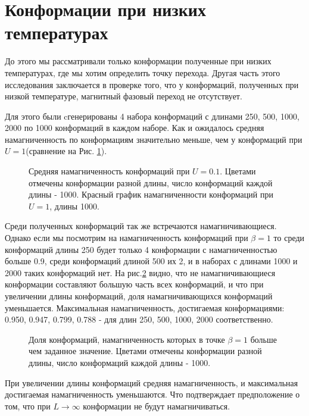 \section{Конформации при низких температурах}
До этого мы рассматривали только конформации полученные при низких температурах, где мы хотим определить точку перехода. Другая часть этого исследования заключается в проверке того, что у конформаций, полученных при низкой температуре, магнитный фазовый переход не отсутствует.

Для этого были cгенерированы 4 набора конформаций с длинами 250, 500, 1000, 2000 по 1000 конформаций в каждом наборе. Как и ожидалось средняя намагниченность по конформациям значительно меньше, чем у конформаций при $U = 1$(сравнение на Рис. \ref{fig:U0.1_mean_mag2}). 

\begin{figure}[htb]
	\centering
	
    
    \caption{Средняя намагниченность конформаций при $U=0.1$. Цветами отмечены конформации разной длины, число конформаций каждой длины - 1000. Красный график намагниченности конформаций при $U=1$, длины 1000.}
    \label{fig:U0.1_mean_mag2}
\end{figure}

Среди полученных конформаций так же встречаются намагничивающиеся. Однако если мы посмотрим на намагниченность конформаций при $\beta = 1$ то среди конформаций длины 250 будет только 4 конформации с намагниченностью больше 0.9, среди конформаций длиной 500 их 2, и в наборах с длинами 1000 и 2000 таких конформаций нет. На рис.\ref{fig:fraction_magnetization} видно, что не намагничивающиеся конформации составляют большую часть всех конформаций, и что при увеличении длины конформаций, доля намагничивающихся конформаций уменьшается. Максимальная намагниченность, достигаемая конформациями: 0.950, 0.947, 0.799, 0.788 - для длин 250, 500, 1000, 2000 соответственно.

\begin{figure}[htb]
	\centering
	
	\caption{Доля конформаций, намагниченность которых в точке $\beta = 1$ больше чем заданное значение. Цветами отмечены конформации разной длины, число конформаций каждой длины - 1000.}
	\label{fig:fraction_magnetization}
\end{figure}

При увеличении длины конформаций средняя намагниченность, и максимальная достигаемая намагниченность уменьшаются. Что подтверждает предположение о том, что при $L\to \infty$ конформации не будут намагничиваться.
